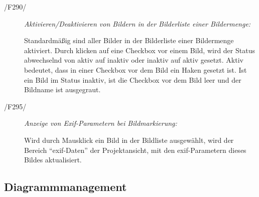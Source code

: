 \begin{description}
		\item[/F290/] \textit{Aktivieren/Deaktivieren von Bildern in der Bilderliste einer Bildermenge:}\par Standardmäßig sind aller Bilder in der Bilderliste einer Bildermenge aktiviert. Durch klicken auf eine Checkbox vor einem Bild, wird der Status abwechselnd von aktiv auf inaktiv oder inaktiv auf aktiv gesetzt. Aktiv bedeutet, dass in einer Checkbox vor dem Bild ein Haken gesetzt ist. Ist ein Bild im Status inaktiv, ist die Checkbox vor dem Bild leer und der Bildname ist ausgegraut.

		\item[/F295/] \textit{Anzeige von Exif-Parametern bei Bildmarkierung:}\par Wird durch Mausklick ein Bild in der Bildliste ausgewählt, wird der Bereich "`\gls{exif}-Daten"' der Projektansicht, mit den \gls{exif}-Parametern dieses Bildes aktualisiert.
		
	\end{description}

\subsection{Diagrammmanagement}

\label{subsec:diagrammmgmt}

